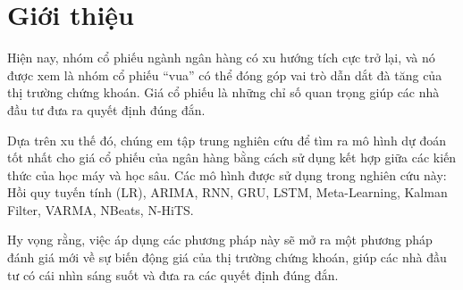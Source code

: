 \section{Giới thiệu}
\label{sec:introduction}
Hiện nay, nhóm cổ phiếu ngành ngân hàng có xu hướng tích cực trở lại, và nó được xem là nhóm cổ phiếu “vua” có thể đóng góp vai trò dẫn dắt đà tăng của thị trường chứng khoán. Giá cổ phiếu là những chỉ số quan trọng giúp các nhà đầu tư đưa ra quyết định đúng đắn.
\par
Dựa trên xu thế đó, chúng em tập trung nghiên cứu để tìm ra mô hình dự đoán tốt nhất cho giá cổ phiếu của ngân hàng bằng cách sử dụng kết hợp giữa các kiến thức của học máy và học sâu. Các mô hình được sử dụng trong nghiên cứu này: Hồi quy tuyến tính (LR), ARIMA, RNN, GRU, LSTM, Meta-Learning, Kalman Filter, VARMA, NBeats, N-HiTS.
\par
Hy vọng rằng, việc áp dụng các phương pháp này sẽ mở ra một phương pháp đánh giá mới về sự biến động giá của thị trường chứng khoán, giúp các nhà đầu tư có cái nhìn sáng suốt và đưa ra các quyết định đúng đắn.


